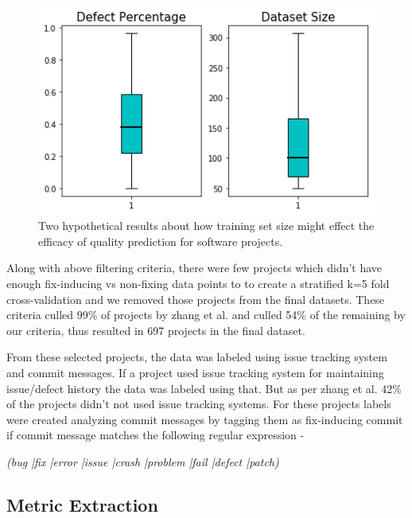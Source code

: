 \documentclass[sigconf,review]{acmart}
\theoremstyle{break}
\begin{document}
\begin{figure}
    \centering
    \includegraphics[width=\linewidth]{figs/meta.png}
    \caption{Two hypothetical results about how training set size might effect the efficacy of quality prediction for software projects.}
    \label{fig:meta}
\end{figure}


Along with above filtering criteria, there were few projects which didn't have enough fix-inducing vs non-fixing data points to to create a stratified k=5 fold cross-validation and we removed those projects from the final datasets. These criteria culled 99\% of projects by zhang et al. and culled 54\% of the remaining by our criteria, thus resulted in 697 projects in the final dataset.

From these selected projects, the data was labeled using issue tracking system and commit messages. If a project used issue tracking system for maintaining issue/defect history the data was labeled using that. But as per zhang et al. 42\% of the projects didn't not used issue tracking systems. For these projects labels were created analyzing commit messages by tagging them as fix-inducing commit if commit message matches the following regular expression - 

\begin{center}
\textit{(bug |fix |error |issue |crash |problem |fail |defect |patch)}
\end{center}
 

\subsection{Metric Extraction}
\label{sec:Metric Extraction}
\end{document}
